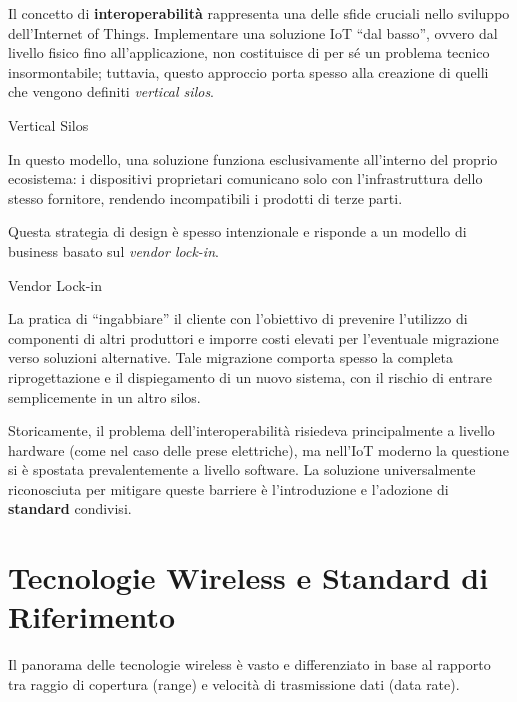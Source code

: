 \documentclass[
  italian,
  openany]{book}
\begin{document}
Il concetto di \textbf{interoperabilità} rappresenta una delle sfide
cruciali nello sviluppo dell'Internet of Things. Implementare una
soluzione IoT ``dal basso'', ovvero dal livello fisico fino
all'applicazione, non costituisce di per sé un problema tecnico
insormontabile; tuttavia, questo approccio porta spesso alla creazione
di quelli che vengono definiti \emph{vertical silos}.

\begin{calloutdefinition}{Vertical Silos}

In questo modello, una soluzione funziona esclusivamente all'interno del
proprio ecosistema: i dispositivi proprietari comunicano solo con
l'infrastruttura dello stesso fornitore, rendendo incompatibili i
prodotti di terze parti.

\end{calloutdefinition}

Questa strategia di design è spesso intenzionale e risponde a un modello
di business basato sul \emph{vendor lock-in}.

\begin{calloutdefinition}{Vendor Lock-in}

La pratica di ``ingabbiare'' il cliente con l'obiettivo di prevenire
l'utilizzo di componenti di altri produttori e imporre costi elevati per
l'eventuale migrazione verso soluzioni alternative. Tale migrazione
comporta spesso la completa riprogettazione e il dispiegamento di un
nuovo sistema, con il rischio di entrare semplicemente in un altro
silos.

\end{calloutdefinition}

Storicamente, il problema dell'interoperabilità risiedeva principalmente
a livello hardware (come nel caso delle prese elettriche), ma nell'IoT
moderno la questione si è spostata prevalentemente a livello software.
La soluzione universalmente riconosciuta per mitigare queste barriere è
l'introduzione e l'adozione di \textbf{standard} condivisi.

\section{Tecnologie Wireless e Standard di
Riferimento}\label{tecnologie-wireless-e-standard-di-riferimento}

Il panorama delle tecnologie wireless è vasto e differenziato in base al
rapporto tra raggio di copertura (range) e velocità di trasmissione dati
(data rate).
\end{document}
